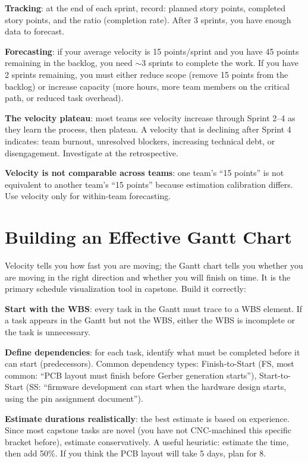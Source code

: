 \textbf{Tracking}: at the end of each sprint, record: planned story points, completed story points, and the ratio (completion rate). After 3 sprints, you have enough data to forecast.

\textbf{Forecasting}: if your average velocity is 15 points/sprint and you have 45 points remaining in the backlog, you need $\sim$3 sprints to complete the work. If you have 2 sprints remaining, you must either reduce scope (remove 15 points from the backlog) or increase capacity (more hours, more team members on the critical path, or reduced task overhead).

\textbf{The velocity plateau}: most teams see velocity increase through Sprint 2--4 as they learn the process, then plateau. A velocity that is declining after Sprint 4 indicates: team burnout, unresolved blockers, increasing technical debt, or disengagement. Investigate at the retrospective.

\textbf{Velocity is not comparable across teams}: one team's ``15 points'' is not equivalent to another team's ``15 points'' because estimation calibration differs. Use velocity only for within-team forecasting.



\section{Building an Effective Gantt Chart}
Velocity tells you how fast you are moving; the Gantt chart tells you whether you are moving in the right direction and whether you will finish on time. It is the primary schedule visualization tool in capstone. Build it correctly:

\textbf{Start with the WBS}: every task in the Gantt must trace to a WBS element. If a task appears in the Gantt but not the WBS, either the WBS is incomplete or the task is unnecessary.

\textbf{Define dependencies}: for each task, identify what must be completed before it can start (predecessors). Common dependency types: Finish-to-Start (FS, most common: ``PCB layout must finish before Gerber generation starts''), Start-to-Start (SS: ``firmware development can start when the hardware design starts, using the pin assignment document'').

\textbf{Estimate durations realistically}: the best estimate is based on experience. Since most capstone tasks are novel (you have not CNC-machined this specific bracket before), estimate conservatively. A useful heuristic: estimate the time, then add 50\%. If you think the PCB layout will take 5 days, plan for 8.

